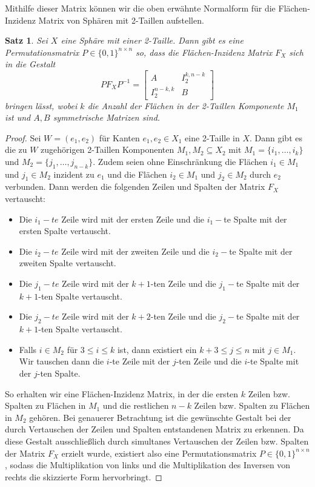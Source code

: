 \documentclass[12pt,titlepage,twoside,cleardoublepage]{article}
\theoremstyle{nummermitklammern}
\newtheorem{satz}[temp]{Satz}
\newtheorem{satz}[zahl]{Satz}
\numberwithin{equation}{section}
\begin{document}
Mithilfe dieser Matrix können wir die oben erwähnte Normalform für die Flächen-Inzidenz Matrix von Sphären mit 2-Taillen aufstellen.
\begin{satz}\label{mat2w}
Sei $X$ eine Sphäre mit einer 2-Taille. Dann gibt es eine Permutationsmatrix $P\in \{0,1\}^{n\times n}$ so, dass die Flächen-Inzidenz Matrix $F_X$ sich in die Gestalt 
\[
PF_XP^{-1}=
\left[ 
\begin{array}{c|c} 
  A & I^{k,n-k}_2 \\ 
  \hline 
  I^{n-k,k}_2 & B 
\end{array} 
\right]
\] 
bringen lässt, wobei $k$ die Anzahl der Flächen in der 2-Taillen Komponente $M_1$ ist und $A,B$ symmetrische Matrizen sind.
\end{satz}
\begin{proof}
Sei $W=(e_1,e_2)$ für Kanten $e_1,e_2\in X_1$ eine 2-Taille in $X.$ Dann gibt es die zu $W$ zugehörigen 2-Taillen Komponenten $M_1,M_2\subseteq X_2$ mit $M_1=\{i_1,\ldots,i_k\}$ und $M_2=\{j_1,\ldots,j_{n-k}\}$. Zudem seien ohne Einschränkung die Flächen $i_1\in M_1$ und $j_1\in M_2$ inzident zu $e_1$ und die Flächen $i_2\in M_1$ und $j_2\in M_2$ durch $e_2$ verbunden. Dann werden die folgenden Zeilen und Spalten der Matrix $F_X$ vertauscht:
\begin{itemize}
\item Die $i_1-te$ Zeile wird mit der ersten Zeile und die  $i_1-$te Spalte mit der ersten Spalte vertauscht.
\item Die $i_2-te$ Zeile wird mit der zweiten Zeile und die $i_2-$te Spalte mit der zweiten Spalte vertauscht.
\item Die $j_1-te$ Zeile wird mit der $k+1$-ten Zeile und die $j_1-$te Spalte mit der $k+1$-ten Spalte vertauscht.
\item Die $j_2-te$ Zeile wird mit der $k+2$-ten Zeile und die $j_2-$te Spalte mit der $k+1$-ten Spalte vertauscht.
\item Falls $i\in M_2$ für $3\leq i \leq k$ ist, dann existiert ein $k+3\leq j\leq n$ mit $j \in M_1.$ 
Wir tauschen dann die $i$-te Zeile mit der $j$-ten Zeile und die $i$-te Spalte mit der $j$-ten Spalte.
\end{itemize} 
So erhalten wir eine Flächen-Inzidenz Matrix, in der die ersten $k$ Zeilen bzw. Spalten zu Flächen in $M_1$ und die restlichen $n-k$ Zeilen bzw. Spalten zu Flächen in $M_2$  gehören. Bei genauerer Betrachtung ist die gewünschte Gestalt  bei der durch Vertauschen der Zeilen und Spalten entstandenen Matrix zu erkennen. Da diese Gestalt ausschließlich durch simultanes Vertauschen der Zeilen bzw. Spalten der Matrix $F_X$ erzielt wurde, existiert also eine Permutationsmatrix $P\in\{0,1\}^{n\times n}$, sodass die Multiplikation von links und die Multiplikation des Inversen von rechts  die skizzierte Form hervorbringt.
\end{proof}
\end{document}
